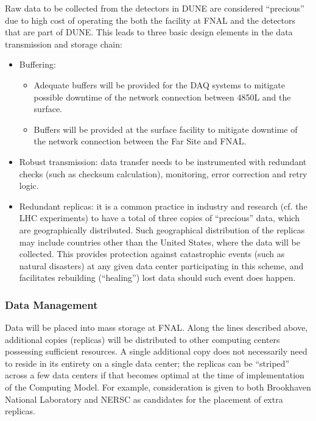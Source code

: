 Raw data to be collected from the detectors in DUNE are considered ``precious'' due to high cost of operating the both the facility at FNAL
and the detectors that are part of DUNE. This leads to three basic design elements in the data transmission and storage chain:
\begin{itemize}
\item Buffering:
\begin{itemize}
\item Adequate buffers will be provided for the DAQ systems  to mitigate possible downtime of the network connection between 4850L and the surface.
\item Buffers will be provided at the surface facility to mitigate downtime of the network connection between the Far Site and FNAL.
\end{itemize}
\item Robust transmission: data transfer needs to be instrumented with redundant checks (such as checksum calculation), monitoring, error correction and retry logic.
\item Redundant replicas: it is a common practice in industry and research (cf. the LHC experiments)
to have a total of three copies of ``precious'' data, which are geographically distributed.
Such geographical distribution of the replicas may include countries other than the United States, where the data will be collected.
This provides protection against catastrophic events (such as natural disasters) at any given data center participating in this scheme, and facilitates rebuilding (``healing'')  lost data should such event does happen.
\end{itemize}


\subsubsection{Data Management}
\label{sec:detectors-sc-infrastructure-computing-model-data-mgt}

Data will be placed into mass storage at FNAL. Along the lines described above, additional copies (replicas) will be distributed to other
computing centers possessing sufficient resources.
A single additional copy does not necessarily need to reside in its entirety on a single data center; the replicas can be ``striped'' across a few data centers if that
becomes optimal at the time of implementation of the Computing Model. For example, consideration is given to both Brookhaven National Laboratory
and NERSC as candidates for the placement of extra replicas.

